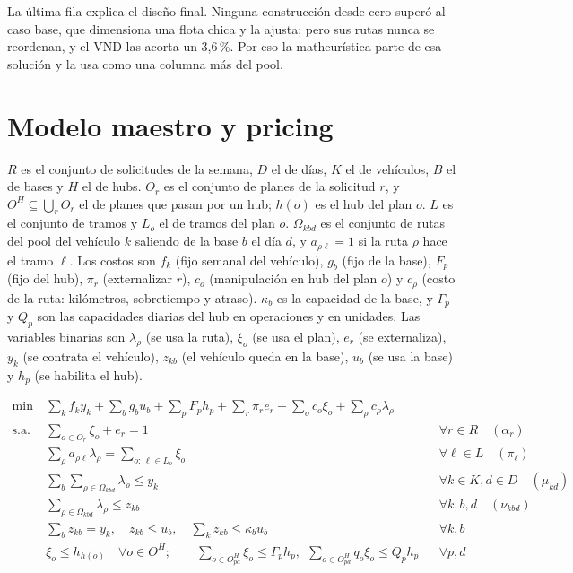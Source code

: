 La última fila explica el diseño final. Ninguna construcción desde cero superó al caso base, que dimensiona una flota chica y la ajusta; pero sus rutas nunca se reordenan, y el VND las acorta un 3,6\,\%. Por eso la matheurística parte de esa solución y la usa como una columna más del pool.

\section{Modelo maestro y pricing}\label{sec:modelo}

 $R$ es el conjunto de solicitudes de la semana, $D$ el de días, $K$ el de vehículos, $B$ el de bases y $H$ el de hubs. $O_r$ es el conjunto de planes de la solicitud $r$, y $O^H\subseteq\bigcup_r O_r$ el de planes que pasan por un hub; $h(o)$ es el hub del plan $o$. $L$ es el conjunto de tramos y $L_o$ el de tramos del plan $o$. $\Omega_{kbd}$ es el conjunto de rutas del pool del vehículo $k$ saliendo de la base $b$ el día $d$, y $a_{\rho\ell}=1$ si la ruta $\rho$ hace el tramo $\ell$. Los costos son $f_k$ (fijo semanal del vehículo), $g_b$ (fijo de la base), $F_p$ (fijo del hub), $\pi_r$ (externalizar $r$), $c_o$ (manipulación en hub del plan $o$) y $c_\rho$ (costo de la ruta: kilómetros, sobretiempo y atraso). $\kappa_b$ es la capacidad de la base, y $\Gamma_p$ y $Q_p$ son las capacidades diarias del hub en operaciones y en unidades. Las variables binarias son $\lambda_\rho$ (se usa la ruta), $\xi_o$ (se usa el plan), $e_r$ (se externaliza), $y_k$ (se contrata el vehículo), $z_{kb}$ (el vehículo queda en la base), $u_b$ (se usa la base) y $h_p$ (se habilita el hub).

\begin{align}
\min\ & \sum_{k} f_k y_k + \sum_{b} g_b u_b + \sum_{p} F_p h_p + \sum_{r} \pi_r e_r + \sum_{o} c_o \xi_o + \sum_{\rho} c_\rho \lambda_\rho \label{eq:fo}\\
\text{s.a.}\ & \textstyle\sum_{o\in O_r} \xi_o + e_r = 1 && \forall r\in R \quad (\alpha_r) \label{eq:m1}\\
& \textstyle\sum_{\rho} a_{\rho\ell}\lambda_\rho = \sum_{o:\,\ell\in L_o} \xi_o && \forall \ell\in L \quad (\pi_\ell) \label{eq:m2}\\
& \textstyle\sum_{b}\sum_{\rho\in\Omega_{kbd}} \lambda_\rho \le y_k && \forall k\in K, d\in D \quad (\mu_{kd}) \label{eq:m3}\\
& \textstyle\sum_{\rho\in\Omega_{kbd}} \lambda_\rho \le z_{kb} && \forall k, b, d \quad (\nu_{kbd}) \label{eq:m4}\\
& \textstyle\sum_{b} z_{kb} = y_k,\quad z_{kb}\le u_b,\quad \sum_{k} z_{kb} \le \kappa_b u_b && \forall k, b \label{eq:m5}\\
& \xi_o \le h_{h(o)} \quad \forall o\in O^H; \qquad \textstyle\sum_{o\in O^H_{pd}} \xi_o \le \Gamma_p h_p,\ \ \sum_{o\in O^H_{pd}} q_o\xi_o \le Q_p h_p && \forall p, d \label{eq:m6}
\end{align}

